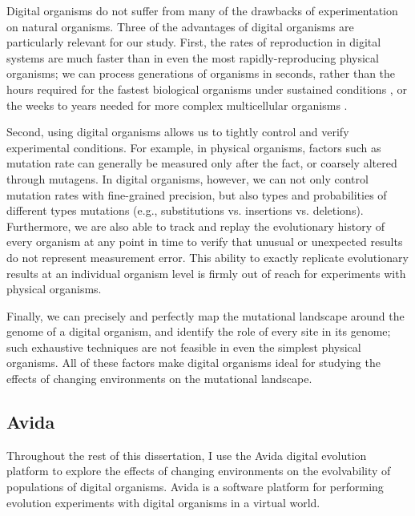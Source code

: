 \documentclass[PhD]{msu-thesis}
\begin{document}
Digital organisms do not suffer from many of the drawbacks of experimentation on natural organisms.  Three of the advantages of digital organisms are particularly relevant for our study.  First, the rates of reproduction in digital systems are much faster than in even the most rapidly-reproducing physical organisms; we can process generations of organisms in seconds, rather than the hours required for the fastest biological organisms under sustained conditions \cite{ryan_evolution_1953,lenski_long-term_1991}, or the weeks to years needed for more complex multicellular organisms \cite{anderson_outcrossing_2010,stearns_experimental_2000}.

Second, using digital organisms allows us to tightly control and verify experimental conditions. For example, in physical organisms, factors such as mutation rate can generally be measured only after the fact, or coarsely altered through mutagens. In digital organisms, however, we can not only control mutation rates with fine-grained precision, but also types and probabilities of different types mutations (e.g., substitutions vs. insertions vs. deletions). Furthermore, we are also able to track and replay the evolutionary history of every organism at any point in time to verify that unusual or unexpected results do not represent measurement error.  This ability to exactly replicate evolutionary results at an individual organism level is firmly out of reach for experiments with physical organisms.

Finally, we can precisely and perfectly map the mutational landscape around the genome of a digital organism, and identify the role of every site in its genome\cite{ofria_evolution_2002}; such exhaustive techniques are not feasible in even the simplest physical organisms.  All of these factors make digital organisms ideal for studying the effects of changing environments on the mutational landscape.

\subsection{Avida}

Throughout the rest of this dissertation, I use the Avida digital evolution platform to explore the effects of changing environments on the evolvability of populations of digital organisms.  %
Avida is a software platform for performing evolution experiments with digital organisms in a virtual world.
\end{document}
